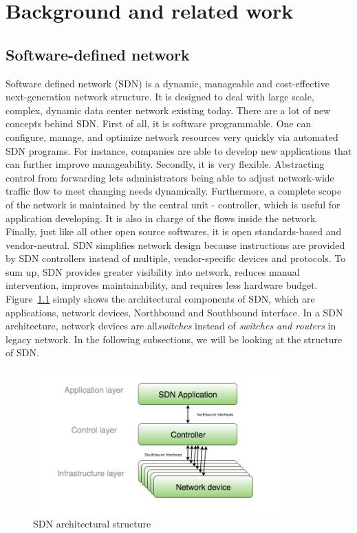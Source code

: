\chapter{Background and related work}

\section{Software-defined network}
\label{Software-defined network}
Software defined network (SDN) is a dynamic, manageable and cost-effective next-generation network structure. It is designed to deal with large scale, complex, dynamic data center network existing today. There are a lot of new concepts behind SDN. First of all, it is software programmable. One can configure, manage, and optimize network resources very quickly via automated SDN programs. For instance, companies are able to develop new applications that can further improve manageability. Secondly, it is very flexible. Abstracting control from forwarding lets administrators being able to adjust network-wide traffic flow to meet changing needs dynamically. Furthermore, a complete scope of the network is maintained by the central unit - controller, which is useful for application developing. It is also in charge of the flows inside the network. Finally, just like all other open source softwares, it is open standards-based and vendor-neutral. SDN simplifies network design because instructions are provided by SDN controllers instead of multiple, vendor-specific devices and protocols. To sum up, SDN provides greater visibility into network, reduces manual intervention, improves maintainability, and requires less hardware budget. Figure~\ref{SDN_struct} simply shows the architectural components of SDN, which are applications, network devices, Northbound and Southbound interface. In a SDN architecture, network devices are all\textit{switches} instead of \textit{switches and routers} in legacy network. In the following subsections, we will be looking at the structure of SDN.

\begin{figure}[H]
\begin{center} 
\includegraphics[width=0.85\textwidth]{figures/SDN_structure.png}
\end{center}
\caption{SDN architectural structure}
\label{SDN_struct}
\end{figure}

